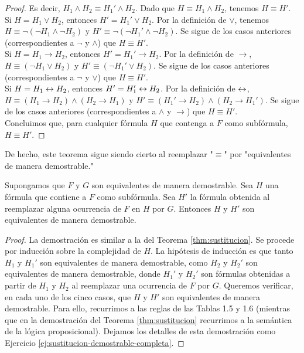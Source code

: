 \documentclass[12pt,a4paper]{book}
\newcommand{\comillas}[1]{"#1"}
\begin{document}
\begin{proof}
        Es decir, $H_{1}\wedge H_{2}\equiv H_{1}'\wedge H_{2}$. Dado que $H\equiv H_{1}\wedge H_{2}$, tenemos $H\equiv H'$.\\
        Si $H=H_{1}\vee H_{2}$, entonces $H'=H_{1}'\vee H_{2}$. Por la definición de $\vee$, tenemos
        $H\equiv\neg(\neg H_{1}\wedge\neg H_{2})$ y $H'\equiv\neg(\neg H_{1}'\wedge\neg H_{2})$. Se sigue de los casos
        anteriores (correspondientes a $\neg$ y $\wedge$) que $H\equiv H'$.\\
        Si $H=H_{1}\rightarrow H_{2}$, entonces $H'=H_{1}'\rightarrow H_{2}$. Por la definición de $\rightarrow$,
        $H\equiv(\neg H_{1}\vee H_{2})$ y $H'\equiv(\neg H_{1}'\vee H_{2})$. Se sigue de los casos anteriores (correspondientes
        a $\neg$ y $\vee$) que $H\equiv H'$.\\
        Si $H=H_{1}\leftrightarrow H_{2}$, entonces $H'=H_{1}'\leftrightarrow H_{2}$. Por la definición de $\leftrightarrow$,
        $H\equiv(H_{1}\rightarrow H_{2})\wedge(H_{2}\rightarrow H_{1})$ y
        $H'\equiv(H_{1}'\rightarrow H_{2})\wedge(H_{2}\rightarrow H_{1}')$. Se sigue de los casos anteriores (correspondientes
        a $\wedge$ y $\rightarrow$) que $H\equiv H'$.\\
        Concluimos que, para cualquier fórmula $H$ que contenga a $F$ como subfórmula, $H\equiv H'$.
    \end{proof}

    De hecho, este teorema sigue siendo cierto al reemplazar \comillas{$\equiv$} por \comillas{equivalentes de manera
    demostrable.}

    \begin{teorema}\label{thm:sustitucion-demostrable}
        Supongamos que $F$ y $G$ son equivalentes de manera demostrable. Sea $H$ una fórmula que contiene a $F$ como
        subfórmula. Sea $H'$ la fórmula obtenida al reemplazar alguna ocurrencia de $F$ en $H$ por $G$. Entonces $H$ y $H'$
        son equivalentes de manera demostrable.
    \end{teorema}
    \begin{proof}
        La demostración es similar a la del Teorema \ref{thm:sustitucion}. Se procede por inducción sobre la complejidad de
        $H$. La hipótesis de inducción es que tanto $H_{1}$ y $H_{1}'$ son equivalentes de manera demostrable, como $H_{2}$ y
        $H_{2}'$ son equivalentes de manera demostrable, donde $H_{1}'$ y $H_{2}'$ son fórmulas obtenidas a partir de $H_{1}$ y
        $H_{2}$ al reemplazar una ocurrencia de $F$ por $G$. Queremos verificar, en cada uno de los cinco casos, que $H$ y $H'$
        son equivalentes de manera demostrable. Para ello, recurrimos a las reglas de las Tablas 1.5 y 1.6 (mientras que en la
        demostración del Teorema \ref{thm:sustitucion} recurrimos a la semántica de la lógica proposicional). Dejamos los
        detalles de esta demostración como Ejercicio \ref{ej:sustitucion-demostrable-completa}.
    \end{proof}
\end{document}
